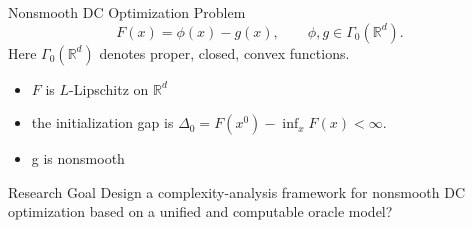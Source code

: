 \documentclass[10pt]{beamer}
\begin{document}
\begin{frame}{Nonsmooth DC Optimization Problem}
\small
\[
    F(x)=\phi(x)-g(x),
    \qquad
    \phi,g\in\Gamma_0(\mathbb R^d).
\]
Here $\Gamma_0(\mathbb R^d)$ denotes proper, closed, convex functions.

\begin{itemize}\setlength{\itemsep}{2pt}
    \item $F$ is $L$-Lipschitz on $\mathbb R^d$
    \item the initialization gap is
    $\Delta_0=F(x^0)-\inf_xF(x)<\infty$.
    \item g is nonsmooth 
\end{itemize}


\vspace{0.08cm}
\begin{alertblock}{Research Goal}
Design a complexity-analysis framework for nonsmooth DC optimization based on
a unified and computable oracle model?
\end{alertblock}
\end{frame}


\end{document}
